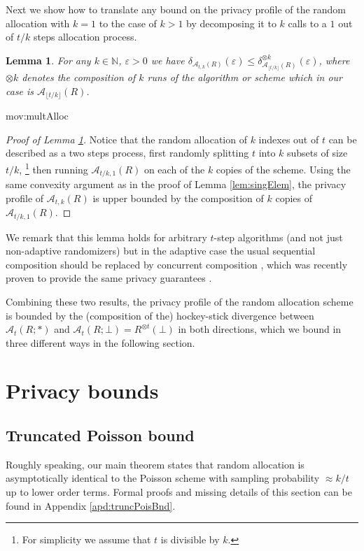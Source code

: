 \documentclass{article}
\newcommand{\NeurIPS}[1]{#1}
\newcommand{\Arxiv}[1]{}
\newcommand{\NeurIPS}[1]{}
\newcommand{\Arxiv}[1]{#1}
\theoremstyle{plain}
\newtheorem{lemma}[theorem]{Lemma}
\theoremstyle{definition}
\newcommand{\eps}{\varepsilon}
\newcommand{\naturals}{\mathbb{N}}
\newcommand{\rand}{R}
\newcommand{\alloc}[2]{\mathcal{A}_{#1}\left(#2\right)}
\newcommand{\allocFunc}[3]{\mathcal{A}_{#1}\left(#2; #3\right)}
\newcommand{\privProf}[1]{\delta_{#1}}
\begin{document}
Next we show how to translate any bound on the privacy profile of the random allocation with $k=1$ to the case of $k > 1$ by decomposing it to $k$ calls to a $1$ out of $t/k$ steps allocation process.

\begin{lemma}\Arxiv{[Reduction to a single allocation]}\label{lem:multAlloc}
    For any $k \in \naturals$, $\eps > 0$ we have $\privProf{\alloc{t, k}{\rand}}(\eps) \le \privProf{\alloc{\lfloor t/k \rfloor}{\rand}}^{\otimes k}(\eps)$, where ${\otimes k}$ denotes the composition of $k$ runs of the algorithm or scheme which in our case is $\alloc{\lfloor t/k \rfloor}{\rand}$.
\end{lemma}

\begin{movable}{mov:multAlloc}{}
\begin{proof}\NeurIPS{[Proof of Lemma \ref{lem:multAlloc}]}
    Notice that the random allocation of $k$ indexes out of $t$ can be described as a two steps process, first randomly splitting $t$ into $k$ subsets of size $t/k$, \footnote{For simplicity we assume that $t$ is divisible by $k$.} then running $\alloc{t/k, 1}{\rand}$ on each  of the $k$ copies of the scheme. Using the same convexity argument as in the proof of Lemma \ref{lem:singElem}, the privacy profile of $\alloc{t, k}{\rand}$ is upper bounded by the composition of $k$ copies of $\alloc{t/k, 1}{\rand}$.
\end{proof}
We remark that this lemma holds for arbitrary $t$-step algorithms (and not just non-adaptive randomizers) but in the adaptive case the usual  sequential composition should be replaced by concurrent composition \citep{VW21}, which was recently proven to provide the same privacy guarantees \citep{lyu22, VZ23}.
\end{movable}

Combining these two results, the privacy profile of the random allocation scheme is bounded by the (composition of the) hockey-stick divergence between $\allocFunc{t}{\rand}{*}$ and $\allocFunc{t}{\rand}{\bot} = \rand^{\otimes t}(\bot)$ in both directions, which we bound in three different ways in the following section.

\section{Privacy bounds}
\subsection{Truncated Poisson bound} \label{sec:truncPoisBnd}
Roughly speaking, our main theorem states that random allocation is asymptotically identical to the Poisson scheme with sampling probability $\approx k/t$ up to lower order terms. Formal proofs and missing details of this section can be found in Appendix \ref{apd:truncPoisBnd}.
\end{document}
